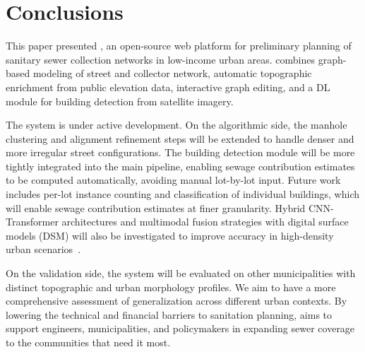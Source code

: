 \section{Conclusions}\label{sec:conclusions}

This paper presented \method, an open-source web platform for preliminary planning of sanitary sewer collection networks in low-income urban areas.
\method combines graph-based modeling of street and collector network, automatic topographic enrichment from public elevation data, interactive graph editing, and a DL module for building detection from satellite imagery.

The system is under active development.
On the algorithmic side, the manhole clustering and alignment refinement steps will be extended to handle denser and more irregular street configurations.
The building detection module will be more tightly integrated into the main pipeline, enabling sewage contribution estimates to be computed automatically, avoiding manual lot-by-lot input.
Future work includes per-lot instance counting and classification of individual buildings, which will enable sewage contribution estimates at finer granularity.
Hybrid CNN-Transformer architectures and multimodal fusion strategies with digital surface models (DSM) will also be investigated to improve accuracy in high-density urban scenarios~\cite{zhou2024hierarchical}.


On the validation side, the system will be evaluated on other municipalities with distinct topographic and urban  morphology profiles.
We aim to have a more comprehensive assessment of generalization across different urban contexts.
By lowering the technical and financial barriers to sanitation planning, \method aims to support engineers, municipalities, and policymakers in expanding sewer coverage to the communities that need it most.
